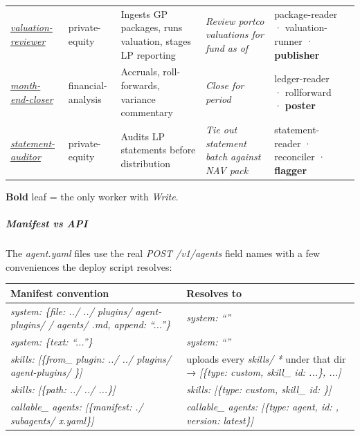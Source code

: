 \documentclass[11pt]{article}
\begin{document}
\begin{longtable}
{} \href{./ valuation-reviewer/}{\emph{valuation-reviewer}} & private-equity & Ingests GP packages, runs valuation, stages LP reporting & \emph{Review portco valuations for fund  as of } & package-reader · valuation-runner · \textbf{publisher} &  &  \\
{} \href{./ month-end-closer/}{\emph{month-end-closer}} & financial-analysis & Accruals, roll-forwards, variance commentary & \emph{Close  for period } & ledger-reader · rollforward · \textbf{poster} &  &  \\
{} \href{./ statement-auditor/}{\emph{statement-auditor}} & private-equity & Audits LP statements before distribution & \emph{Tie out statement batch  against  NAV pack} & statement-reader · reconciler · \textbf{flagger} &  &  \\
\bottomrule
\end{longtable}
\endgroup

\textbf{Bold} leaf = the only worker with \emph{Write}.


\subparagraph{Manifest vs API}\mbox{}\par

The \emph{agent.yaml} files use the real \emph{POST /v1/agents} field names with a few conveniences the deploy script resolves:


\begingroup
\small
\setlength{\tabcolsep}{2pt}
\begin{longtable}{>{\RaggedRight\arraybackslash\hspace{0pt}}p{}>{\RaggedRight\arraybackslash\hspace{0pt}}p{}}
\toprule
{} \textbf{Manifest convention} & \textbf{Resolves to} \\
\midrule
{} \emph{system: \{file: ../ ../ plugins/ agent-plugins/ / agents/ .md, append: ``...''\}} & \emph{system: ``''} \\
{} \emph{system: \{text: ``...''\}} & \emph{system: ``''} \\
{} \emph{skills: [\{from\_\allowbreak{} plugin: ../ ../ plugins/ agent-plugins/ \}]} & uploads every \emph{skills/ *} under that dir → \emph{[\{type: custom, skill\_\allowbreak{} id: ...\}, ...]} \\
{} \emph{skills: [\{path: ../ ../ ...\}]} & \emph{skills: [\{type: custom, skill\_\allowbreak{} id: \}]} \\
{} \emph{callable\_\allowbreak{} agents: [\{manifest: ./ subagents/ x.yaml\}]} & \emph{callable\_\allowbreak{} agents: [\{type: agent, id: , version: latest\}]} \\
\bottomrule
\end{longtable}
\endgroup
\end{document}

